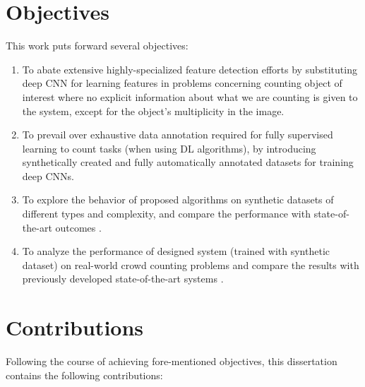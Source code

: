 \section{Objectives}
This work puts forward several objectives:
\begin{enumerate}

\item To abate extensive highly-specialized feature detection efforts by substituting deep CNN for learning features in problems concerning counting object of interest where no explicit information about what we are counting is given to the system, except for the object's multiplicity in the image.

\item To prevail over exhaustive data annotation required for fully supervised learning to count tasks (when using DL algorithms), by introducing synthetically created and fully automatically annotated datasets for training deep CNNs.   

\item To explore the behavior of proposed algorithms on synthetic datasets of different types and complexity, and compare the performance with state-of-the-art outcomes \cite{segui2015learning}.   

\item To analyze the performance of designed system (trained with synthetic dataset) on real-world crowd counting problems and compare the results with previously developed state-of-the-art systems \cite{chan2008privacy}.   
 

\end{enumerate}
\section{Contributions}
Following the course of achieving fore-mentioned objectives, this dissertation contains the following contributions: 

